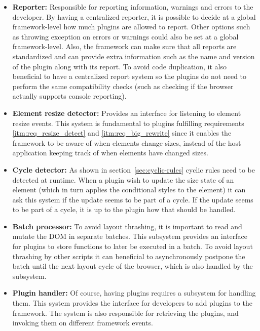 \documentclass[a4paper,11pt]{kth-mag}
\begin{document}
        \begin{itemize}
          \item \textbf{Reporter:}
            Responsible for reporting information, warnings and errors to the developer.
            By having a centralized reporter, it is possible to decide at a global framework-level how much plugins are allowed to report.
            Other options such as throwing exception on errors or warnings could also be set at a global framework-level.
            Also, the framework can make sure that all reports are standardized and can provide extra information such as the name and version of the plugin along with its report.
            To avoid code duplication, it also beneficial to have a centralized report system so the plugins do not need to perform the same compatibility checks (such as checking if the \gls{browser} actually supports console reporting).
          \item \textbf{Element resize detector:}
            Provides an interface for listening to \gls{element} resize events.
            This system is fundamental to plugins fulfilling requirements \ref{itm:req_resize_detect} and \ref{itm:req_big_rewrite} since it enables the framework to be aware of when \glspl{element} change sizes, instead of the host application keeping track of when \glspl{element} have changed sizes.
          \item \textbf{Cycle detector:}
            As shown in section~\ref{sec:cyclic-rules} cyclic rules need to be detected at runtime.
            When a plugin wish to update the size state of an \gls{element} (which in turn applies the conditional styles to the \gls{element}) it can ask this system if the update seems to be part of a cycle.
            If the update seems to be part of a cycle, it is up to the plugin how that should be handled.
          \item \textbf{Batch processor:}
            To avoid layout thrashing, it is important to read and mutate the \gls{DOM} in separate batches.
            This subsystem provides an interface for plugins to store functions to later be executed in a batch.
            To avoid layout thrashing by other scripts it can beneficial to asynchronously postpone the batch until the next layout cycle of the \gls{browser}, which is also handled by the subsystem.
          \item \textbf{Plugin handler:}
            Of course, having plugins requires a subsystem for handling them.
            This system provides the interface for developers to add plugins to the framework.
            The system is also responsible for retrieving the plugins, and invoking them on different framework events.
        \end{itemize}
\end{document}
